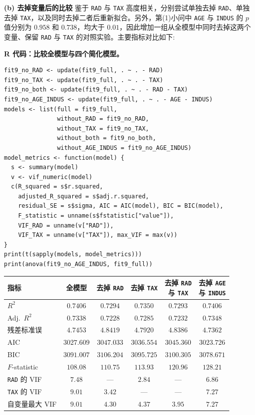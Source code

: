 \documentclass[12pt,a4paper]{article}
\begin{document}
\begin{answerbox}
\textbf{(b) 去掉变量后的比较}\quad
鉴于 \texttt{RAD} 与 \texttt{TAX} 高度相关，分别尝试单独去掉 \texttt{RAD}、单独去掉 \texttt{TAX}，以及同时去掉二者后重新拟合。另外，第(1)小问中 \texttt{AGE} 与 \texttt{INDUS} 的 $p$ 值分别为 $0.958$ 和 $0.738$，均大于 $0.01$，因此增加一组从全模型中同时去掉这两个变量、保留 \texttt{RAD} 与 \texttt{TAX} 的对照实验。主要指标对比如下:

\textbf{R 代码：比较全模型与四个简化模型。}
\begin{lstlisting}[style=rcode]
fit9_no_RAD <- update(fit9_full, . ~ . - RAD)
fit9_no_TAX <- update(fit9_full, . ~ . - TAX)
fit9_no_both <- update(fit9_full, . ~ . - RAD - TAX)
fit9_no_AGE_INDUS <- update(fit9_full, . ~ . - AGE - INDUS)
models <- list(full = fit9_full,
               without_RAD = fit9_no_RAD,
               without_TAX = fit9_no_TAX,
               without_both = fit9_no_both,
               without_AGE_INDUS = fit9_no_AGE_INDUS)
model_metrics <- function(model) {
  s <- summary(model)
  v <- vif_numeric(model)
  c(R_squared = s$r.squared,
    adjusted_R_squared = s$adj.r.squared,
    residual_SE = s$sigma, AIC = AIC(model), BIC = BIC(model),
    F_statistic = unname(s$fstatistic["value"]),
    VIF_RAD = unname(v["RAD"]),
    VIF_TAX = unname(v["TAX"]), max_VIF = max(v))
}
print(t(sapply(models, model_metrics)))
print(anova(fit9_no_AGE_INDUS, fit9_full))
\end{lstlisting}

\begin{center}
\small
\setlength{\tabcolsep}{4pt}
\begin{tabular}{lccccc}
\toprule
指标 & 全模型 & 去掉 \texttt{RAD} & 去掉 \texttt{TAX} & \shortstack{去掉 \texttt{RAD}\\与 \texttt{TAX}} & \shortstack{去掉 \texttt{AGE}\\与 \texttt{INDUS}} \\
\midrule
$R^2$         & $0.7406$ & $0.7294$ & $0.7350$ & $0.7293$ & $0.7406$ \\
Adj.\ $R^2$   & $0.7338$ & $0.7228$ & $0.7285$ & $0.7232$ & $0.7348$ \\
残差标准误    & $4.7453$ & $4.8419$ & $4.7920$ & $4.8386$ & $4.7362$ \\
AIC           & $3027.609$ & $3047.033$ & $3036.554$ & $3045.360$ & $3023.726$ \\
BIC           & $3091.007$ & $3106.204$ & $3095.725$ & $3100.305$ & $3078.671$ \\
$F$-statistic & $108.08$ & $110.75$ & $113.93$ & $120.96$ & $128.21$ \\
\texttt{RAD} 的 VIF & $7.48$ & --- & $2.84$ & --- & $6.86$ \\
\texttt{TAX} 的 VIF & $9.01$ & $3.42$ & --- & --- & $7.27$ \\
自变量最大 VIF & $9.01$ & $4.30$ & $4.37$ & $3.95$ & $7.27$ \\
\bottomrule
\end{tabular}
\end{center}


\end{answerbox}
\end{document}
